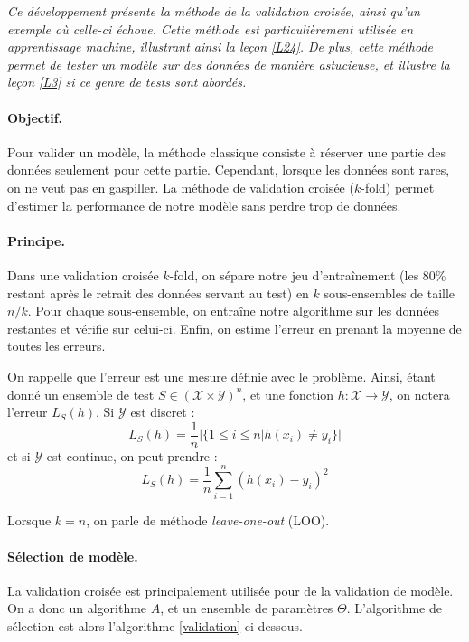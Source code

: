 
\textit{ Ce développement présente la méthode de la validation croisée, ainsi qu'un exemple où celle-ci échoue. Cette méthode est particulièrement utilisée en apprentissage machine, illustrant ainsi la leçon \ref{L24}. De plus, cette méthode permet de tester un modèle sur des données de manière astucieuse, et illustre la leçon \ref{L3} si ce genre de tests sont abordés.}

\paragraph{Objectif.} Pour valider un modèle, la méthode classique consiste à réserver une partie des données seulement pour cette partie. Cependant, lorsque les données sont rares, on ne veut pas en gaspiller. La méthode de validation croisée ($k$-fold) permet d'estimer la performance de notre modèle sans perdre trop de données.

\paragraph{Principe.} Dans une validation croisée $k$-fold, on sépare notre jeu d'entraînement (les 80\% restant après le retrait des données servant au test) en $k$ sous-ensembles de taille $n/k$. Pour chaque sous-ensemble, on entraîne notre algorithme sur les données restantes et vérifie sur celui-ci. Enfin, on estime l'erreur en prenant la moyenne de toutes les erreurs.

\begin{rem}
On rappelle que l'erreur est une mesure définie avec le problème. Ainsi, étant donné un ensemble de test $S \in (\mathcal{X} \times \mathcal{Y})^n$, et une fonction $h : \mathcal{X} \rightarrow \mathcal{Y}$, on notera l'erreur $L_S(h)$. Si $\mathcal{Y}$ est discret :
$$
L_S(h) = \frac{1}{n} |\{1\leq i \leq n | h(x_i) \neq y_i\}|
$$
et si $\mathcal{Y}$ est continue, on peut prendre :
$$
L_S(h) = \frac{1}{n} \sum_{i=1}^n (h(x_i)-y_i)^2
$$
\end{rem}  

\begin{rem}
Lorsque $k=n$, on parle de méthode \textit{leave-one-out} (LOO).
\end{rem}

\paragraph{Sélection de modèle.} La validation croisée est principalement utilisée pour de la validation de modèle. On a donc un algorithme $A$, et un ensemble de paramètres $\Theta$. L'algorithme de sélection est alors l'algorithme \ref{validation} ci-dessous.

